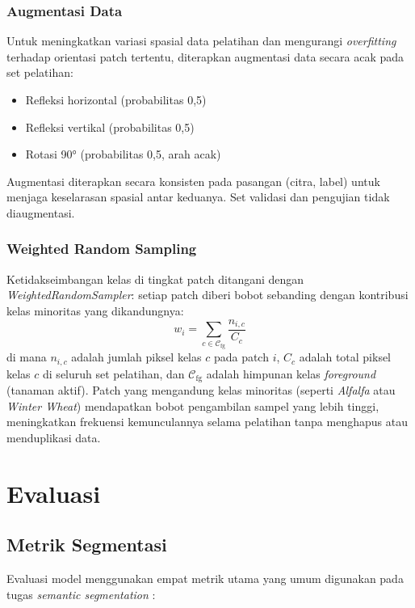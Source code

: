 \subsubsection{Augmentasi Data}
Untuk meningkatkan variasi spasial data pelatihan dan mengurangi \textit{overfitting} terhadap orientasi patch tertentu, diterapkan augmentasi data secara acak pada set pelatihan:
\begin{itemize}
    \item Refleksi horizontal (probabilitas 0,5)
    \item Refleksi vertikal (probabilitas 0,5)
    \item Rotasi 90° (probabilitas 0,5, arah acak)
\end{itemize}
Augmentasi diterapkan secara konsisten pada pasangan (citra, label) untuk menjaga keselarasan spasial antar keduanya. Set validasi dan pengujian tidak diaugmentasi.

\subsubsection{Weighted Random Sampling}
Ketidakseimbangan kelas di tingkat patch ditangani dengan \textit{WeightedRandomSampler}: setiap patch diberi bobot sebanding dengan kontribusi kelas minoritas yang dikandungnya:
\begin{equation}
    w_i = \sum_{c \in \mathcal{C}_{\text{fg}}} \frac{n_{i,c}}{C_c}
\end{equation}
di mana $n_{i,c}$ adalah jumlah piksel kelas $c$ pada patch $i$, $C_c$ adalah total piksel kelas $c$ di seluruh set pelatihan, dan $\mathcal{C}_{\text{fg}}$ adalah himpunan kelas \textit{foreground} (tanaman aktif).
Patch yang mengandung kelas minoritas (seperti \textit{Alfalfa} atau \textit{Winter Wheat}) mendapatkan bobot pengambilan sampel yang lebih tinggi, meningkatkan frekuensi kemunculannya selama pelatihan tanpa menghapus atau menduplikasi data.

\section{Evaluasi}

\subsection{Metrik Segmentasi}

Evaluasi model menggunakan empat metrik utama yang umum digunakan pada tugas \textit{semantic segmentation} \citep{thomasramos2024}:

